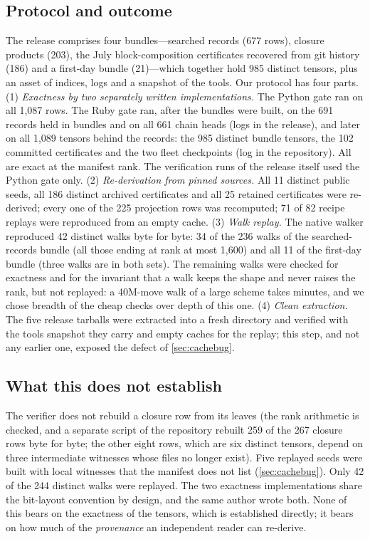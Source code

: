 \subsection{Protocol and outcome}
The release comprises four bundles---searched records (677 rows), closure products (203), the July block-composition certificates recovered from git history (186) and a first-day bundle (21)---which together hold 985 distinct tensors, plus an asset of indices, logs and a snapshot of the tools.
Our protocol has four parts.
(1) \emph{Exactness by two separately written implementations.} The Python gate ran on all 1{,}087 rows. The Ruby gate ran, after the bundles were built, on the 691 records held in bundles and on all 661 chain heads (logs in the release), and later on all 1{,}089 tensors behind the records: the 985 distinct bundle tensors, the 102 committed certificates and the two fleet checkpoints (log in the repository). All are exact at the manifest rank. The verification runs of the release itself used the Python gate only.
(2) \emph{Re-derivation from pinned sources.} All 11 distinct public seeds, all 186 distinct archived certificates and all 25 retained certificates were re-derived; every one of the 225 projection rows was recomputed; 71 of 82 recipe replays were reproduced from an empty cache.
(3) \emph{Walk replay.} The native walker reproduced 42 distinct walks byte for byte: 34 of the 236 walks of the searched-records bundle (all those ending at rank at most 1{,}600) and all 11 of the first-day bundle (three walks are in both sets). The remaining walks were checked for exactness and for the invariant that a walk keeps the shape and never raises the rank, but not replayed:
a 40M-move walk of a large scheme takes minutes, and we chose breadth of the cheap checks over depth of this one.
(4) \emph{Clean extraction.} The five release tarballs were extracted into a fresh directory and verified with the tools snapshot they carry and empty caches for the replay; this step, and not any earlier one, exposed the defect of \cref{sec:cachebug}.

\subsection{What this does not establish}
The verifier does not rebuild a closure row from its leaves (the rank arithmetic is checked, and a separate script of the repository rebuilt 259 of the 267 closure rows byte for byte; the other eight rows, which are six distinct tensors, depend on three intermediate witnesses whose files no longer exist).
Five replayed seeds were built with local witnesses that the manifest does not list (\cref{sec:cachebug}).
Only 42 of the 244 distinct walks were replayed.
The two exactness implementations share the bit-layout convention by design, and the same author wrote both.
None of this bears on the exactness of the tensors, which is established directly; it bears on how much of the \emph{provenance} an independent reader can re-derive.
